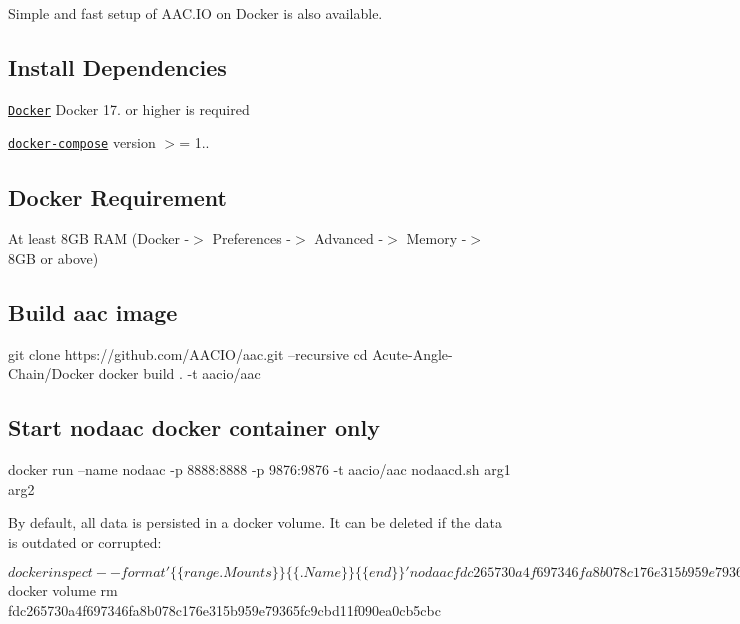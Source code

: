 Simple and fast setup of A\+A\+C.\+IO on Docker is also available.

\subsection*{Install Dependencies}


\begin{DoxyItemize}
\item \href{https://docs.docker.com}{\tt Docker} Docker 17. or higher is required
\item \href{https://docs.docker.com/compose/}{\tt docker-\/compose} version $>$= 1..
\end{DoxyItemize}

\subsection*{Docker Requirement}


\begin{DoxyItemize}
\item At least 8\+GB R\+AM (Docker -\/$>$ Preferences -\/$>$ Advanced -\/$>$ Memory -\/$>$ 8\+GB or above)
\end{DoxyItemize}

\subsection*{Build aac image}


\begin{DoxyCode}
git clone https://github.com/AACIO/aac.git --recursive
cd Acute-Angle-Chain/Docker
docker build . -t aacio/aac
\end{DoxyCode}


\subsection*{Start nodaac docker container only}


\begin{DoxyCode}
docker run --name nodaac -p 8888:8888 -p 9876:9876 -t aacio/aac nodaacd.sh arg1 arg2
\end{DoxyCode}


By default, all data is persisted in a docker volume. It can be deleted if the data is outdated or corrupted\+: 
\begin{DoxyCode}
$ docker inspect --format '\{\{ range .Mounts \}\}\{\{ .Name \}\} \{\{ end \}\}' nodaac
fdc265730a4f697346fa8b078c176e315b959e79365fc9cbd11f090ea0cb5cbc
$ docker volume rm fdc265730a4f697346fa8b078c176e315b959e79365fc9cbd11f090ea0cb5cbc
\end{DoxyCode}


